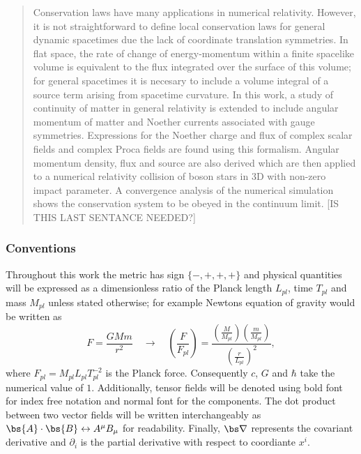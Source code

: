 


\begin{abstract}
Conservation laws have many applications in numerical relativity. However, it is not straightforward to define local conservation laws for general dynamic spacetimes due the lack of coordinate translation symmetries. In flat space, the rate of change of energy-momentum within a finite spacelike volume is equivalent to the flux integrated over the surface of this volume; for general spacetimes it is necesary to include a volume integral of a source term arising from spacetime curvature. In this work, a study of continuity of matter in general relativity is extended to include angular momentum of matter and Noether currents associated with gauge symmetries. Expressions for the Noether charge and flux of complex scalar fields and complex Proca fields are found using this formalism. Angular momentum density, flux and source are also derived which are then applied to a numerical relativity collision of boson stars in 3D with non-zero impact parameter. A convergence analysis of the numerical simulation shows the conservation system to be obeyed in the continuum limit. [IS THIS LAST SENTANCE NEEDED?]  

\end{abstract}






\subsubsection*{Conventions}

Throughout this work the metric has sign $\{-,+,+,+\}$ and physical quantities will be expressed as a dimensionless ratio of the Planck length $L_{pl}$, time $T_{pl}$ and mass $M_{pl}$ unless stated otherwise; for example Newtons equation of gravity would be written as
\begin{equation}
F=\frac{GMm}{r^2} \quad \rightarrow \quad\left(\frac{F}{F_{pl}}\right) = \frac{\left(\frac{M}{M_{pl}}\right)  \left(\frac{m}{M_{pl}}\right)}{\left(\frac{r}{L_{pl}}\right)^2},
\end{equation}
where $F_{pl} = M_{pl}L_{pl}T_{pl}^{-2}$ is the Planck force. Consequently $c$, $G$ and $\hbar$ take the numerical value of $1$. Additionally, tensor fields will be denoted using bold font for index free notation and normal font for the components. The dot product between two vector fields will be written interchangeably as $\bs{A}\cdot\bs{B}\leftrightarrow A^\mu B_\mu$ for readability. Finally, $\bs\nabla$ represents the covariant derivative and $\partial_i$ is the partial derivative with respect to coordiante $x^i$.
